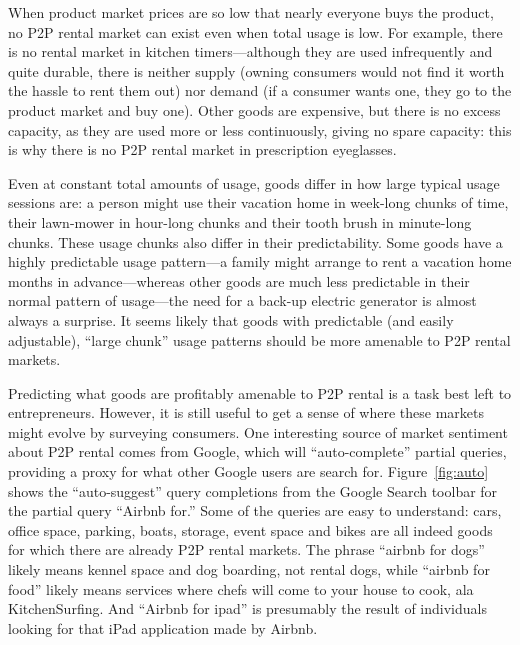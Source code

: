 \documentclass[11pt]{article}
\begin{document}
When product market prices are so low that nearly everyone buys the product, no P2P rental market can exist even when total usage is low.  
For example, there is no rental market in kitchen timers---although they are used infrequently and quite durable, there is neither supply (owning consumers would not find it worth the hassle to rent them out) nor demand (if a consumer wants one, they go to the product market and buy one). 
Other goods are expensive, but there is no excess capacity, as they are used more or less continuously, giving no spare capacity: this is why there is no P2P rental market in prescription eyeglasses. 

Even at constant total amounts of usage, goods differ in how large typical usage sessions are: 
a person might use their vacation home in week-long chunks of time, their lawn-mower in hour-long chunks and their tooth brush in minute-long chunks. 
These usage chunks also differ in their predictability. 
Some goods have a highly predictable usage pattern---a family might arrange to rent a vacation home months in advance---whereas other goods are much less predictable in their normal pattern of usage---the need for a back-up electric generator is almost always a surprise.  
It seems likely that goods with predictable (and easily adjustable), ``large chunk'' usage patterns should be more amenable to P2P rental markets. 

Predicting what goods are profitably amenable to P2P rental is a task best left to entrepreneurs. 
However, it is still useful to get a sense of where these markets might evolve by surveying consumers. 
One interesting source of market sentiment about P2P rental comes from Google, which will ``auto-complete'' partial queries, providing a proxy for what other Google users are search for. 
Figure~\ref{fig:auto} shows the ``auto-suggest'' query completions from the Google Search toolbar for the partial query ``Airbnb for.''
Some of the queries are easy to understand: 
cars, office space, parking, boats, storage, event space and bikes are all indeed goods for which there are already P2P rental markets. 
The phrase ``airbnb for dogs'' likely means kennel space and dog boarding, not rental dogs, while ``airbnb for food'' likely means services where chefs will come to your house to cook, ala KitchenSurfing. 
And ``Airbnb for ipad'' is presumably the result of individuals looking for that iPad application made by Airbnb. 
\end{document}
